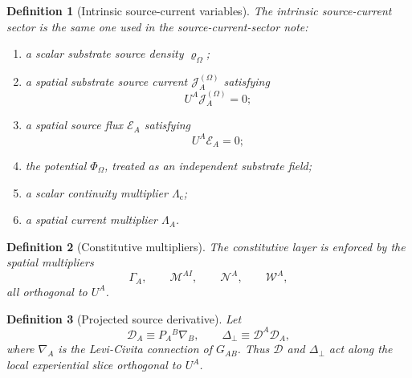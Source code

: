 \documentclass[11pt]{article}
\newcommand{\ProjSub}{P}
\newcommand{\SpatialD}{\mathcal D}
\newcommand{\LapPerp}{\Delta_\perp}
\newcommand{\FlowPot}{\Phi_\Omega}
\newcommand{\SourceDensity}{\varrho_\Omega}
\newcommand{\SourceCurrent}{\mathcal J^{(\Omega)}}
\newcommand{\ContMult}{\Lambda_{\mathrm c}}
\newcommand{\CurrentMult}{\Lambda}
\newcommand{\ConstGamma}{\Gamma}
\newcommand{\QMult}{\mathscr M}
\newcommand{\ChiMult}{\mathscr N}
\newcommand{\TransMult}{\mathscr W}
\newcommand{\SourceFlux}{\mathcal E}
\newtheorem{definition}{Definition}
\begin{document}
\begin{definition}[Intrinsic source-current variables]
\label{def:sourcevars}
The \emph{intrinsic source-current sector} is the same one used in the source-current-sector note:
\begin{enumerate}
    \item a scalar substrate source density \(\SourceDensity\);
    \item a spatial substrate source current \(\SourceCurrent_A\) satisfying
    \begin{equation}
    U^A\SourceCurrent_A=0;
    \label{eq:spatialcurrent}
    \end{equation}
    \item a spatial source flux \(\SourceFlux_A\) satisfying
    \begin{equation}
    U^A\SourceFlux_A=0;
    \label{eq:spatialflux}
    \end{equation}
    \item the potential \(\FlowPot\), treated as an independent substrate field;
    \item a scalar continuity multiplier \(\ContMult\);
    \item a spatial current multiplier \(\CurrentMult_A\).
\end{enumerate}
\end{definition}

\begin{definition}[Constitutive multipliers]
\label{def:mults}
The constitutive layer is enforced by the spatial multipliers
\begin{equation}
\ConstGamma_A,
\qquad
\QMult^{AI},
\qquad
\ChiMult^A,
\qquad
\TransMult^A,
\label{eq:mults}
\end{equation}
all orthogonal to \(U^A\).
\end{definition}

\begin{definition}[Projected source derivative]
\label{def:projected}
Let
\begin{equation}
\SpatialD_A\equiv \ProjSub_A{}^B\nabla_B,
\qquad
\LapPerp\equiv \SpatialD^A\SpatialD_A,
\label{eq:projderiv}
\end{equation}
where \(\nabla_A\) is the Levi-Civita connection of \(G_{AB}\). Thus \(\SpatialD\) and \(\LapPerp\) act along the local experiential slice orthogonal to \(U^A\).
\end{definition}
\end{document}
